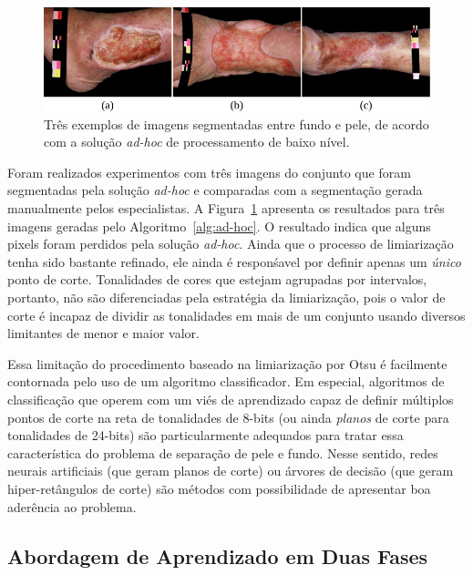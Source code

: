 \begin{figure}[!htb]
\centering
\includegraphics[scale=1.2]{_fig/otsu_result.pdf}
\caption[Três exemplos de imagens segmentadas de acordo com a solução \textit{ad-hoc}]{Três exemplos de imagens segmentadas entre fundo e pele, de acordo com a solução \textit{ad-hoc} de processamento de baixo nível.}
\label{fig:res_adhoc}
\end{figure}

Foram realizados experimentos com três imagens do conjunto \dataset que foram segmentadas pela solução \textit{ad-hoc} e comparadas com a segmentação gerada manualmente pelos especialistas.
A Figura~\ref{fig:res_adhoc} apresenta os resultados para três imagens geradas pelo Algoritmo~\ref{alg:ad-hoc}.
O resultado indica que alguns pixels foram perdidos pela solução \textit{ad-hoc}.
Ainda que o processo de limiarização tenha sido bastante refinado, ele ainda é responśavel por definir apenas um \textit{único} ponto de corte.
Tonalidades de cores que estejam agrupadas por intervalos, portanto, não são diferenciadas pela estratégia da limiarização, pois o valor de corte é incapaz de dividir as tonalidades em mais de um conjunto usando diversos limitantes de menor e maior valor.

Essa limitação do procedimento baseado na limiarização por Otsu é facilmente contornada pelo uso de um algoritmo classificador.
Em especial, algoritmos de classificação que operem com um viés de aprendizado capaz de definir múltiplos pontos de corte na reta de tonalidades de 8-bits (ou ainda \textit{planos} de corte para tonalidades de 24-bits) são particularmente adequados para tratar essa característica do problema de separação de pele e fundo.
Nesse sentido, redes neurais artificiais (que geram planos de corte) ou árvores de decisão (que geram hiper-retângulos de corte) são métodos com possibilidade de apresentar boa aderência ao problema.


\subsection{Abordagem de Aprendizado em Duas Fases}

